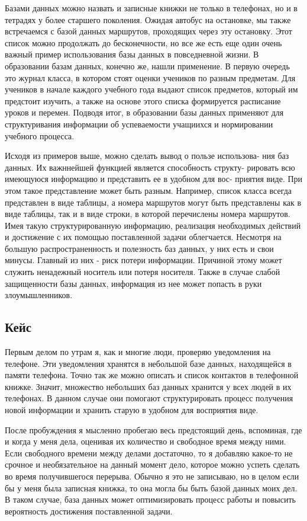 \documentclass[14pt]{extreport}
\begin{document}
Базами данных можно назвать и записные книжки не только в телефонах, но и в тетрадях у более старшего поколения. Ожидая автобус на остановке, мы также встречаемся с базой данных маршрутов, проходящих через эту остановку. Этот список можно продолжать до бесконечности, но все же есть еще один очень важный пример использования базы данных в повседневной жизни.
В образовании базам данных, конечно же, нашли применение. В первую
очередь это журнал класса, в котором стоят оценки учеников по разным
предметам. Для учеников в начале каждого учебного года выдают список предметов, который им предстоит изучить, а также на основе этого списка формируется расписание уроков и перемен. Подводя итог, в образовании базы данных применяют для структуривания информации об успеваемости учащиихся и нормировании учебного процесса.

Исходя из примеров выше, можно сделать вывод о пользе использова-
ния баз данных. Их важннейшей функцией является способность структу-
рировать всю имеющуюся информацию и представить ее в удобном для вос-
приятия виде. При этом такое представление может быть разным. Например, список класса всегда представлен в виде таблицы, а номера маршрутов могут быть представлены как в виде таблицы, так и в виде строки, в которой перечислены номера маршрутов. Имея такую структурированную информацию, реализация необходимых действий и достижение с их помощью поставленной задачи облегчается.
Несмотря на большую распространенность и полезность баз данных, у
них есть и свои минусы. Главный из них - риск потери информации. Причиной этому может служить ненадежный носитель или потеря носителя. Также в
случае слабой защищенности базы данных, информация из нее может попасть
в руки злоумышленников.

\subsection{Кейс}

Первым делом по утрам я, как и многие люди, проверяю уведомления на телефоне. Эти уведомления хранятся в небольшой базе данных, находящейся в памяти телефона. Точно так же можно описать и список контактов в телефонной книжке. Значит, множество небольших баз данных хранится у всех людей в их телефонах. В данном случае они помогают структурировать процесс получения новой информации и хранить старую в удобном для восприятия виде.

После пробуждения я мысленно пробегаю весь предстоящий день, вспоминая, где и когда у меня дела, оценивая их количество и свободное время между ними. Если свободного времени между делами достаточно, то я добавляю какое-то не срочное и необязательное на данный момент дело, которое можно успеть сделать во время получившегося перерыва. Обычно я это не записываю, но в целом если бы у меня была записная книжка, то она могла бы быть базой данных моих дел. В таком случае, база данных может оптимизировать процесс работы и повысить вероятность достижения поставленной задачи.
\end{document}
